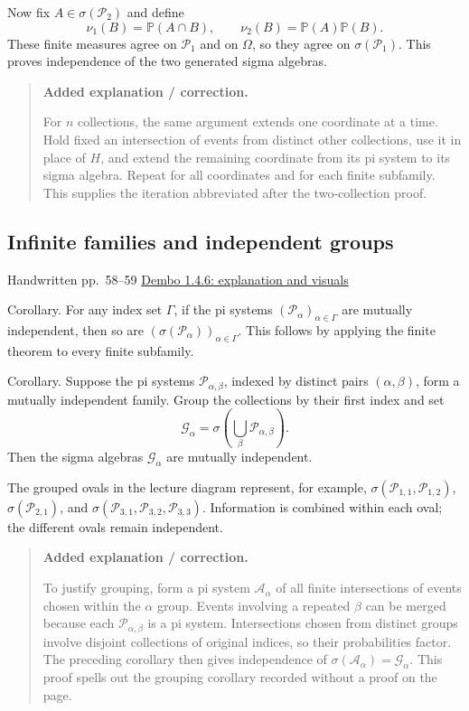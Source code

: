 \documentclass[11pt,letterpaper]{article}
\newcommand{\lecturesection}[1]{\subsection{#1}}
\begin{document}
Now fix $A\in\sigma(\mathcal P_2)$ and define \[\nu_1(B)=\mathbb P(A\cap B),\qquad \nu_2(B)=\mathbb P(A)\mathbb P(B).\] These finite measures agree on $\mathcal P_1$ and on $\Omega$, so they agree on $\sigma(\mathcal P_1)$. This proves independence of the two generated sigma algebras.

\begin{quote}\small\textbf{Added explanation / correction.}

For $n$ collections, the same argument extends one coordinate at a time. Hold fixed an intersection of events from distinct other collections, use it in place of $H$, and extend the remaining coordinate from its pi system to its sigma algebra. Repeat for all coordinates and for each finite subfamily. This supplies the iteration abbreviated after the two-collection proof.
\end{quote}

\hypertarget{l7-s6}{}
\lecturesection{Infinite families and independent groups}
{\small\textcolor{lectureink}{Handwritten pp.\ 58--59} \quad \href{https://josephrbailey.com/probability/\#entry-1-4-6}{Dembo 1.4.6: explanation and visuals}}

Corollary. For any index set $\Gamma$, if the pi systems $(\mathcal P_\alpha)_{\alpha\in\Gamma}$ are mutually independent, then so are $(\sigma(\mathcal P_\alpha))_{\alpha\in\Gamma}$. This follows by applying the finite theorem to every finite subfamily.

Corollary. Suppose the pi systems $\mathcal P_{\alpha,\beta}$, indexed by distinct pairs $(\alpha,\beta)$, form a mutually independent family. Group the collections by their first index and set \[\mathcal G_\alpha=\sigma\left(\bigcup_\beta\mathcal P_{\alpha,\beta}\right).\] Then the sigma algebras $\mathcal G_\alpha$ are mutually independent.

The grouped ovals in the lecture diagram represent, for example, $\sigma(\mathcal P_{1,1},\mathcal P_{1,2})$, $\sigma(\mathcal P_{2,1})$, and $\sigma(\mathcal P_{3,1},\mathcal P_{3,2},\mathcal P_{3,3})$. Information is combined within each oval; the different ovals remain independent.

\begin{quote}\small\textbf{Added explanation / correction.}

To justify grouping, form a pi system $\mathcal A_\alpha$ of all finite intersections of events chosen within the $\alpha$ group. Events involving a repeated $\beta$ can be merged because each $\mathcal P_{\alpha,\beta}$ is a pi system. Intersections chosen from distinct groups involve disjoint collections of original indices, so their probabilities factor. The preceding corollary then gives independence of $\sigma(\mathcal A_\alpha)=\mathcal G_\alpha$. This proof spells out the grouping corollary recorded without a proof on the page.
\end{quote}
\end{document}
